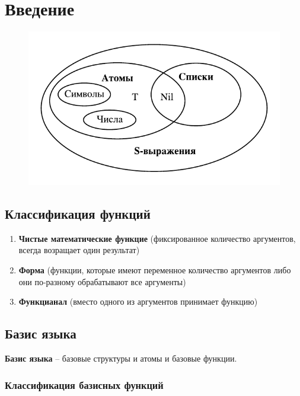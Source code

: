 \chapter{Введение}

\begin{figure}[H]
    \centering
    \includegraphics{img/expression.pdf}
\end{figure}

\section{Классификация функций}

\begin{enumerate}
    \item \textbf{Чистые математические функцие}
        (фиксированное количество аргументов, всегда возращает
        один результат)
    \item \textbf{Форма}
        (функции, которые имеют переменное количество аргументов либо
        они по-разному обрабатывают все аргументы)
    \item \textbf{Функцианал}
        (вместо одного из аргументов принимает функцию)
\end{enumerate}

\section{Базис языка}

\textbf{Базис языка} -- базовые структуры и атомы и базовые функции.

\subsection{Классификация базисных функций}

